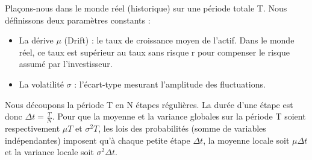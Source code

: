 \begin{definitionbox}
Plaçons-nous dans le monde réel (historique) sur une période totale T. 
Nous définissons deux paramètres constants :
\begin{itemize}[label=$\rightarrow$]
    \item La dérive $\mu$ (Drift) : le taux de croissance moyen de l'actif. Dans le monde réel, ce taux est supérieur au taux sans risque r pour compenser le risque assumé par l'investisseur.
    \item La volatilité $\sigma$ : l'écart-type mesurant l'amplitude des fluctuations.
\end{itemize}
Nous découpons la période T en N étapes régulières. La durée d'une étape est donc $\Delta t = \frac{T}{N}$.
Pour que la moyenne et la variance globales sur la période T soient respectivement $\mu T$ et $\sigma^2 T$, les lois des probabilités (somme de variables indépendantes) imposent qu'à chaque petite étape $\Delta t$, la moyenne locale soit $\mu \Delta t$ et la variance locale soit $\sigma^2 \Delta t$.
\end{definitionbox}

